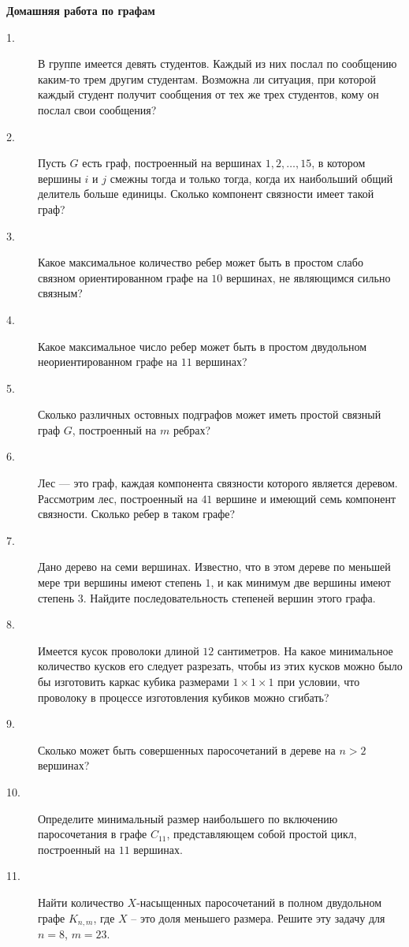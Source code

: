 \documentclass[a4paper,12pt]{article}
\theoremstyle{plain}
\theoremstyle{definition}
\theoremstyle{remark}
\begin{document}
\begin{center}
{\large \textbf{Домашняя работа по графам}}
\end{center}
\begin{description}
\item[1.]
В группе имеется девять студентов. 
Каждый из них послал по сообщению каким-то трем другим студентам. 
Возможна ли ситуация, при которой каждый студент получит 
сообщения от тех же трех студентов, 
кому он послал свои сообщения?
\item[2.] Пусть $G$ есть граф, 
построенный на вершинах $1, 2, \ldots, 15$, 
в котором вершины $i$ и $j$ смежны тогда и только тогда, 
когда их наибольший общий делитель больше единицы. 
Сколько компонент связности имеет такой граф?
\item[3.] Какое максимальное количество ребер может быть в простом
слабо связном ориентированном графе на $10$ вершинах, 
не являющимся сильно связным?
\item[4.] Какое максимальное число ребер может быть в простом 
двудольном неориентированном графе на $11$ вершинах?
\item[5.] Сколько различных остовных подграфов может иметь 
простой связный граф $G$, построенный на $m$ ребрах?
\item[6.] Лес — это граф, каждая компонента 
связности которого является деревом.\\ 
Рассмотрим лес, построенный на $41$ вершине и 
имеющий семь компонент связности. Сколько ребер в таком графе?
\item[7.] Дано дерево на семи вершинах. 
Известно, что в этом дереве по меньшей мере три вершины 
имеют степень $1$, и как минимум две вершины имеют степень $3$. 
Найдите последовательность степеней вершин этого графа.
\item[8.] Имеется кусок проволоки длиной $12$ сантиметров. 
На какое минимальное количество кусков его следует разрезать, 
чтобы из этих кусков можно было бы изготовить каркас кубика размерами 
$1 \times 1 \times 1$ при условии, 
что проволоку в процессе изготовления кубиков можно сгибать?
\item[9.] Сколько может быть совершенных паросочетаний в дереве на $n>2$ вершинах?
\item[10.] Определите минимальный размер наибольшего по включению паросочетания в графе 
$C_{11}$, представляющем собой простой цикл, построенный на $11$ вершинах.
\item[11.] Найти количество $X$-насыщенных паросочетаний 
в полном двудольном графе $K_{n,m}$, где $X$ -- это доля меньшего размера.
Решите эту задачу для $n=8$, $m = 23$.
\end{description}
\end{document}
